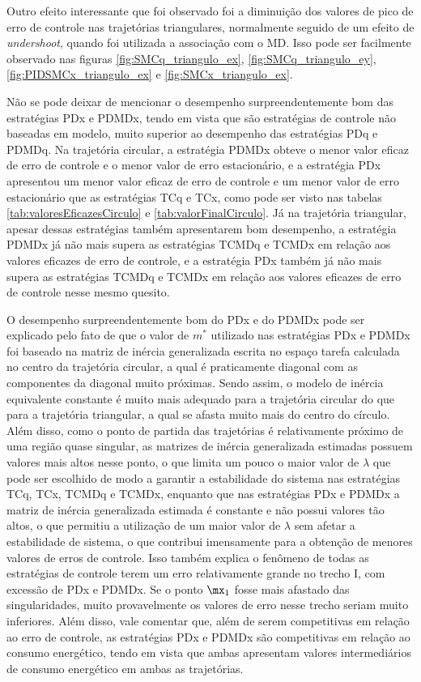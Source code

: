 \documentclass[]{politex}
\begin{document}
Outro efeito interessante que foi observado foi a diminuição dos valores de pico de erro de controle nas trajetórias triangulares, normalmente seguido de um efeito de \emph{undershoot}, quando foi utilizada a associação com o MD. Isso pode ser facilmente observado nas figuras \ref{fig:SMCq_triangulo_ex}, \ref{fig:SMCq_triangulo_ey}, \ref{fig:PIDSMCx_triangulo_ex} e \ref{fig:SMCx_triangulo_ex}.

Não se pode deixar de mencionar o desempenho surpreendentemente bom das estratégias PDx e PDMDx, tendo em vista que são estratégias de controle não baseadas em modelo, muito superior ao desempenho das estratégias PDq e PDMDq. Na trajetória circular, a estratégia PDMDx obteve o menor valor eficaz de erro de controle e o menor valor de erro estacionário, e a estratégia PDx apresentou um menor valor eficaz de erro de controle e um menor valor de erro estacionário que as estratégias TCq e TCx, como pode ser visto nas tabelas \ref{tab:valoresEficazesCirculo} e \ref{tab:valorFinalCirculo}. Já na trajetória triangular, apesar dessas estratégias também apresentarem bom desempenho, a estratégia PDMDx já não mais supera as estratégias TCMDq e TCMDx em relação aos valores eficazes de erro de controle, e a estratégia PDx também já não mais supera as estratégias TCMDq e TCMDx em relação aos valores eficazes de erro de controle nesse mesmo quesito.

O desempenho surpreendentemente bom do PDx e do PDMDx pode ser explicado pelo fato de que o valor de $m^*$ utilizado nas estratégias PDx e PDMDx foi baseado na matriz de inércia generalizada escrita no espaço tarefa calculada no centro da trajetória circular, a qual é praticamente diagonal com as componentes da diagonal muito próximas. Sendo assim, o modelo de inércia equivalente constante é muito mais adequado para a trajetória circular do que para a trajetória triangular, a qual se afasta muito mais do centro do círculo. Além disso, como o ponto de partida das trajetórias é relativamente próximo de uma região quase singular, as matrizes de inércia generalizada estimadas possuem valores mais altos nesse ponto, o que limita um pouco o maior valor de $\lambda$ que pode ser escolhido de modo a garantir a estabilidade do sistema nas estratégias TCq, TCx, TCMDq e TCMDx, enquanto que nas estratégias PDx e PDMDx a matriz de inércia generalizada estimada é constante e não possui valores tão altos, o que permitiu a utilização de um maior valor de $\lambda$ sem afetar a estabilidade de sistema, o que contribui imensamente para a obtenção de menores valores de erros de controle. Isso também explica o fenômeno de todas as estratégias de controle terem um erro relativamente grande no trecho I, com excessão de PDx e PDMDx. Se o ponto $\mx_1$ fosse mais afastado das singularidades, muito provavelmente os valores de erro nesse trecho seriam muito inferiores. Além disso, vale comentar que, além de serem competitivas em relação ao erro de controle, as estratégias PDx e PDMDx são competitivas em relação ao consumo energético, tendo em vista que ambas apresentam valores intermediários de consumo energético em ambas as trajetórias.
\end{document}
